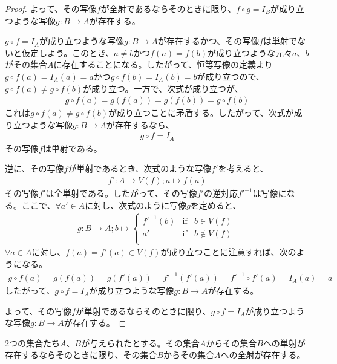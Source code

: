 \documentclass[dvipdfmx]{jsarticle}
\begin{document}
\begin{proof}
よって、その写像$f$が全射であるならそのときに限り、$f \circ g = I_{B}$が成り立つような写像$g:B \rightarrow A$が存在する。\par
$g \circ f = I_{A}$が成り立つような写像$g:B \rightarrow A$が存在するかつ、その写像$f$は単射でないと仮定しよう。このとき、$a \neq b$かつ$f(a) = f(b)$が成り立つような元々$a$、$b$がその集合$A$に存在することになる。したがって、恒等写像の定義より$g \circ f(a) = I_{A}(a) = a$かつ$g \circ f(b) = I_{A}(b) = b$が成り立つので、$g \circ f(a) \neq g \circ f(b)$が成り立つ。一方で、次式が成り立つが、
\begin{align*}
g \circ f(a) = g\left( f(a) \right) = g\left( f(b) \right) = g \circ f(b)
\end{align*}
これは$g \circ f(a) \neq g \circ f(b)$が成り立つことに矛盾する。したがって、次式が成り立つような写像$g:B \rightarrow A$が存在するなら、
\begin{align*}
g \circ f = I_{A}
\end{align*}
その写像$f$は単射である。\par
逆に、その写像$f$が単射であるとき、次式のような写像$f'$を考えると、
\begin{align*}
f':A \rightarrow V(f);a \mapsto f(a)
\end{align*}
その写像$f'$は全単射である。したがって、その写像$f'$の逆対応${f'}^{- 1}$は写像になる。ここで、$\forall a' \in A$に対し、次式のように写像$g$を定めると、
\begin{align*}
g:B \rightarrow A;b \mapsto \left\{ \begin{matrix}
{f'}^{- 1}(b) & {\mathrm{if}} & b \in V(f) \\
a' & {\mathrm{if}} & b \notin V(f) \\
\end{matrix} \right.\ 
\end{align*}
$\forall a \in A$に対し、$f(a) = f'(a) \in V(f)$が成り立つことに注意すれば、次のようになる。
\begin{align*}
g \circ f(a) = g\left( f(a) \right) = g\left( f'(a) \right) = {f'}^{- 1}\left( f'(a) \right) = {f'}^{- 1} \circ f'(a) = I_{A}(a) = a
\end{align*}
したがって、$g \circ f = I_{A}$が成り立つような写像$g:B \rightarrow A$が存在する。\par
よって、その写像$f$が単射であるならそのときに限り、$g \circ f = I_{A}$が成り立つような写像$g:B \rightarrow A$が存在する。
\end{proof}
\begin{thm}\label{1.2.5.5}
2つの集合たち$A$、$B$が与えられたとする。その集合$Aからその集合B$への単射が存在するならそのときに限り、その集合$Bからその集合A$への全射が存在する。
\end{thm}
\end{document}
